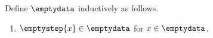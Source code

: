 \begin{datatype}\label{empty_data}
    Define $\emptydata$ inductively as follows.
    \begin{enumerate}
        \item $\emptystep{x} \in \emptydata$ for $x \in \emptydata$.
    \end{enumerate}
\end{datatype}
